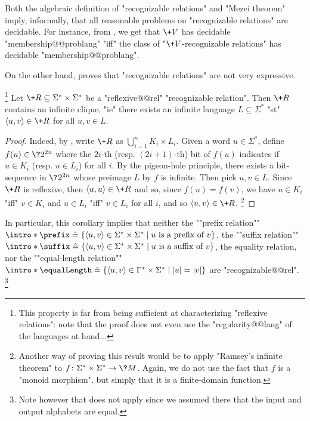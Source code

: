 Both the algebraic definition of "recognizable relations" and
"Mezei theorem" imply, informally, that all reasonable problems on
"recognizable relations" are decidable. For instance, from ,
we get that $\+V$ has decidable "membership@@problang" "iff" the class of "$\+V$-recognizable relations"
has decidable "membership@@problang".

On the other hand,  proves that "recognizable relations" are not very expressive.
\begin{corollary}
	\!\footnote[][-3cm]{This property is far from being sufficient
	at characterizing "reflexive relations": note that the proof
	does not even use the "regularity@@lang" of the languages at hand...}%
	\AP\label{coro:infinite-clique-recognizable}
	Let $\+R \subseteq \Sigma^* \times \Sigma^*$ be a "reflexive@@rel" "recognizable relation".
	Then $\+R$ contains an infinite clique, "ie"
	there exists an infinite language $L \subseteq \Sigma^*$ "st"
	$\tup{u,v} \in \+R$ for all $u,v \in L$.
\end{corollary}
\begin{proof}
	Indeed, by , write $\+R$ as $\bigcup_{i=1}^n K_i \times L_i$.
	Given a word $u \in \Sigma^*$, define $f(u) \in \?2^{2n}$ where
	the $2i$-th (resp. $(2i+1)$-th) bit of $f(u)$ indicates if $u \in K_i$ (resp. $u \in L_i$)
	for all $i$.
	By the pigeon-hole principle, there exists a bit-sequence in $\?2^{2n}$ whose preimage
	$L$ by $f$ is infinite. Then pick $u,v \in L$. Since $\+R$ is reflexive, then
	$\tup{u,u} \in \+R$ and so, since $f(u) = f(v)$, we
	have $u \in K_i$ "iff" $v \in K_i$ and
	$u \in L_i$ "iff" $v \in L_i$ for all $i$, and so $\tup{u,v} \in \+R$.%
	\footnote{Another way of proving this result would be
	to apply "Ramsey's infinite theorem" to $f\colon \Sigma^* \times \Sigma^* \to \?M$.
	Again, we do not use the fact that $f$ is a "monoid morphism", but simply
	that it is a finite-domain function.}
\end{proof}

In particular, this corollary implies that neither the \AP""prefix relation""
${\intro*\prefix} \defeq \{
	\tup{u,v} \in \Sigma^*\times\Sigma^* \mid
	\text{$u$ is a prefix of $v$}
\}$, the \AP""suffix relation""
${\intro*\suffix} \defeq \{
	\tup{u,v} \in \Sigma^*\times\Sigma^* \mid
	\text{$u$ is a suffix of $v$}
\}$, the equality relation, nor the ""equal-length relation""
${\intro*\equalLength} \defeq \{
	\tup{u,v} \in \Gamma^*\times\Sigma^* \mid
	|u| = |v|
\}$ are "recognizable@@rel".%
\footnote{Note however that  does not apply since
we assumed there that the input and output alphabets are equal.}

